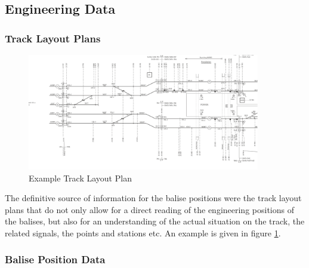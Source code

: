 \documentclass{template/openetcs_article}
\begin{document}
\subsection{Engineering Data}
\subsubsection{Track Layout Plans}

\begin{figure}
  \centering
  \includegraphics[angle=90, origin=c, width=4in]{images/Breukelen_Crop}
  \caption{Example Track Layout Plan}
  \label{fig:breukelen}
\end{figure}

The definitive source of information for the balise positions were the track layout plans that do not only allow for a direct reading of the engineering positions of the balises, but also for an understanding of the actual situation on the track, the related signals, the points and stations etc. An example is given in figure \ref{fig:breukelen}.\newline



\subsubsection{Balise Position Data}
\end{document}
